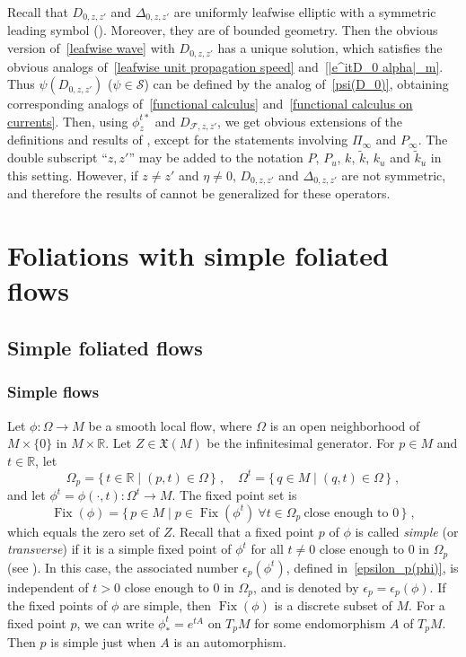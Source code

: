 \documentclass{memo-l}
\theoremstyle{plain}
\theoremstyle{definition}
\theoremstyle{remark}
\newcommand{\R}{\mathbb{R}}
\newcommand{\FF}{\mathcal{F}}
\renewcommand{\SS}{\mathcal{S}}
\newcommand{\fX}{\mathfrak{X}}
\newcommand{\Fix}{\operatorname{Fix}}
\numberwithin{section}{chapter}
\numberwithin{equation}{section}%
\begin{document}
Recall that $D_{0,z,z'}$ and $\Delta_{0,z,z'}$ are uniformly leafwise elliptic with a symmetric leading symbol (). Moreover, they are of bounded geometry. Then the obvious version of~\eqref{leafwise wave} with $D_{0,z,z'}$ has a unique solution, which satisfies the obvious analogs of~\eqref{leafwise unit propagation speed} and~\eqref{|e^itD_0 alpha|_m}. Thus $\psi(D_{0,z,z'})$ ($\psi\in\SS$) can be defined by the analog of~\eqref{psi(D_0)}, obtaining corresponding analogs of~\eqref{functional calculus} and~\eqref{functional calculus on currents}. Then, using $\phi^{t*}_z$ and $D_{\FF,z,z'}$, we get obvious extensions of the definitions and results of , except for the statements involving $\Pi_\infty$ and $P_\infty$. The double subscript ``$z,z'$'' may be added to the notation $P$, $P_u$, $k$, $\tilde k$, $k_u$ and $\tilde k_u$ in this setting. However, if $z\ne z'$ and $\eta\ne0$,  $D_{0,z,z'}$ and $\Delta_{0,z,z'}$ are not symmetric, and therefore the results of  cannot be generalized for these operators.



\chapter{Foliations with simple foliated flows}\label{ch: fols with simple fol flows}

\section{Simple foliated flows}\label{s: simple fol flows}

\subsection{Simple flows}\label{ss: simple flows}

Let $\phi:\Omega\to M$ be a smooth local flow, where $\Omega$ is an open neighborhood of $M\times\{0\}$ in $M\times\R$. Let $Z\in\fX(M)$ be the infinitesimal generator. For $p\in M$ and $t\in\R$, let
\[
\Omega_p=\{\,t\in\R\mid(p,t)\in\Omega\,\}\;,\quad\Omega^t=\{\,q\in M\mid(q,t)\in\Omega\,\}\;,
\]
and let $\phi^t=\phi(\cdot,t):\Omega^t\to M$. The fixed point set is
\[
\Fix(\phi)=\{\,p\in M\mid p\in\Fix(\phi^t)\ \forall t\in\Omega_p\ \text{close enough to $0$}\,\}\;,
\]
which equals the zero set of $Z$. Recall that a fixed point $p$ of $\phi$ is called \emph{simple} (or \emph{transverse}) if it is a simple fixed point of $\phi^t$ for all $t\ne0$ close enough to $0$ in $\Omega_p$ (see ). In this case, the associated number $\epsilon_p(\phi^t)$, defined in~\eqref{epsilon_p(phi)}, is independent of $t>0$ close enough to $0$ in $\Omega_p$, and is denoted by $\epsilon_p=\epsilon_p(\phi)$. If the fixed points of $\phi$ are simple, then $\Fix(\phi)$ is a discrete subset of $M$. For a fixed point $p$, we can write $\phi^t_*=e^{tA}$ on $T_pM$ for some endomorphism $A$ of $T_pM$. Then $p$ is simple just when $A$ is an automorphism.
\end{document}
